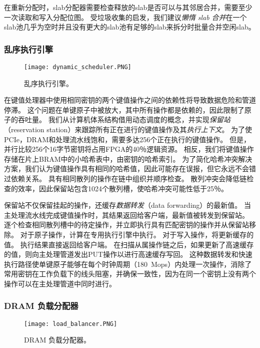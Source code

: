 在重新分配时，slab分配器需要检查释放的slab是否可以与其邻居合并，需要至少一次读取和写入分配位图。
受垃圾收集的启发，我们建议\textit {懒惰 slab 合并}在一个slab池几乎为空时并且没有更大的slab池有足够的slab来拆分时批量合并空闲slab。

\subsubsection{乱序执行引擎}
\label{kvdirect:sec:ooo}

\begin{figure}[t]
\centering
\texttt{[image: dynamic\_scheduler.PNG]}
\caption{乱序执行引擎。}
\label{kvdirect:fig:ooo-mem-access}
\end{figure}

在键值处理器中使用相同密钥的两个键值操作之间的依赖性将导致数据危险和管道停滞。
这个问题在单键原子中被放大，其中所有操作都是依赖的，因此限制了原子的吞吐量。
我们从计算机体系结构借用动态调度的概念，并实现\textit {保留站}（reservation station）来跟踪所有正在进行的键值操作及其\textit {执行上下文}。
为了使PCIe，DRAM和处理流水线饱和，需要多达256个正在执行的键值操作。
但是，并行比较256个16字节密钥将占用FPGA的40％逻辑资源。
相反，我们将键值操作存储在片上BRAM中的小哈希表中，由密钥的哈希索引。
为了简化哈希冲突解决方案，我们认为键值操作具有相同的哈希值，因此可能存在误报，但它永远不会错过依赖关系。
具有相同散列的操作在链中组织并顺序检查。
散列冲突会降低链检查的效率，因此保留站包含1024个散列槽，使哈希冲突可能性低于25％。

保留站不仅保留挂起的操作，还缓存\textit {数据转发}（data forwarding）的最新值。
当主处理流水线完成键值操作时，其结果返回给客户端，最新值被转发到保留站。
逐个检查相同散列槽中的待定操作，并立即执行具有匹配密钥的操作并从保留站移除。
对于原子操作，计算在专用执行引擎中执行。
对于写入操作，将更新缓存的值。
执行结果直接返回给客户端。
在扫描从属操作链之后，如果更新了高速缓存的值，则向主处理管道发出PUT操作以进行高速缓存写回。
这种数据转发和快速执行路径使单键原子能够在每个时钟周期（180~Mops）内处理一次操作，消除了常用密钥在工作负载下的线头阻塞，并确保一致性，因为在同一个密钥上没有两个操作可以在主处理管道中同时进行。


\subsubsection{DRAM 负载分配器}
\label{kvdirect:sec:dram-cache}

\begin{figure}[t]
\centering
\texttt{[image: load\_balancer.PNG]}
\caption{DRAM 负载分配器。}
\label{kvdirect:fig:cache}

\end{figure}

